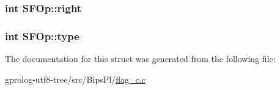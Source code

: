\subsubsection[{\texorpdfstring{right}{right}}]{\setlength{\rightskip}{0pt plus 5cm}int S\+F\+Op\+::right}\hypertarget{structSFOp_a53d1624dfd48f82123f055f8578646e7}{}\label{structSFOp_a53d1624dfd48f82123f055f8578646e7}
\subsubsection[{\texorpdfstring{type}{type}}]{\setlength{\rightskip}{0pt plus 5cm}int S\+F\+Op\+::type}\hypertarget{structSFOp_a2edfc96ff91474523b5bda2185158ffa}{}\label{structSFOp_a2edfc96ff91474523b5bda2185158ffa}


The documentation for this struct was generated from the following file\+:\begin{DoxyCompactItemize}
\item 
gprolog-\/utf8-\/tree/src/\+Bips\+Pl/\hyperlink{flag__c_8c}{flag\+\_\+c.\+c}\end{DoxyCompactItemize}
